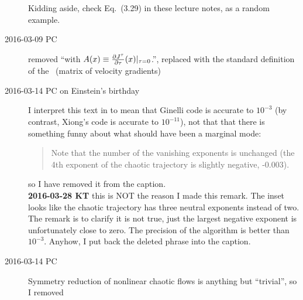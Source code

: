 \begin{description}
Kidding aside, check Eq.~(3.29) in
{these lecture notes}, as a random example.




\item[2016-03-09 PC]
removed ``with $A(x)\equiv\frac{\partial{}J^\tau}{\partial\tau}(x)|_{\tau=0}$.'',
replaced with the standard definition of the \stabmat\ (matrix of velocity gradients)

\item[2016-03-14 PC on Einstein's birthday]
I interpret this text in  to mean that Ginelli
\etal{} code is accurate to $10^{-3}$ (by contrast,
Xiong's code is accurate to $10^{-11}$), not that that there is something
funny about what should have been a marginal mode:

\begin{quote}
    Note that the number of the vanishing exponents is unchanged
    (the 4th exponent of the chaotic trajectory is slightly negative, -0.003).
\end{quote}

so I have removed it from the caption.
\\{\bf 2016-03-28 KT}
this is NOT the reason I made this remark. The inset looks like the
chaotic trajectory has three neutral exponents instead of two. The remark
is to clarify it is not true, just the largest negative exponent is
unfortunately close to zero. The precision of the algorithm is better
than $10^{-3}$. Anyhow, I put back the deleted phrase into the caption.

\item[2016-03-14 PC]
Symmetry reduction of nonlinear chaotic flows is anything but
``trivial'', so I removed


\end{description}
